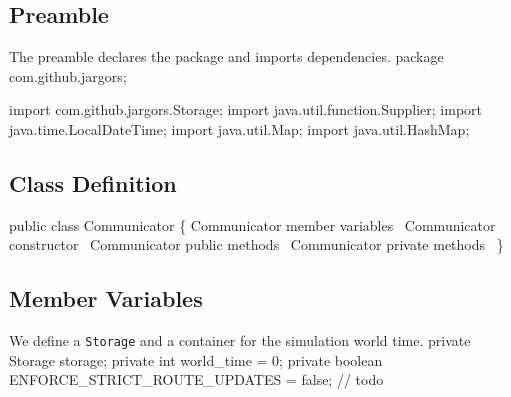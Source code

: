 \documentclass{article}
\def\nwendcode{\endtrivlist \endgroup}      %
\let\nwdocspar=\par
\begin{document}
\subsection{Preamble}
\label{sec:preamble}
The preamble declares the package and imports dependencies.
\nwenddocs{}\endmoddef{}
package com.github.jargors;
\nwendcode{}\nwdocspar
\nwenddocs{}\plusendmoddef
import com.github.jargors.Storage;
import java.util.function.Supplier;
import java.time.LocalDateTime;
import java.util.Map;
import java.util.HashMap;
\nwendcode{}\nwdocspar

\subsection{Class Definition}
\label{sec:class-definition}
\nwenddocs{}\endmoddef{}
public class Communicator \{
  \LA{}\code{}Communicator\edoc{} member variables~{\nwtagstyle{}}\RA{}
  \LA{}\code{}Communicator\edoc{} constructor~{\nwtagstyle{}}\RA{}
  \LA{}\code{}Communicator\edoc{} public methods~{\nwtagstyle{}}\RA{}
  \LA{}\code{}Communicator\edoc{} private methods~{\nwtagstyle{}}\RA{}
\}
\nwendcode{}\nwdocspar

\subsection{Member Variables}
\label{sec:member-variables}
We define a {\tt{}Storage} and a container for the simulation world time.
\nwenddocs{}\endmoddef{}
private Storage storage;
private int world_time = 0;
private boolean ENFORCE_STRICT_ROUTE_UPDATES = false;  // todo
\eatline
{}\nwendcode{}\nwdocspar
\end{document}
